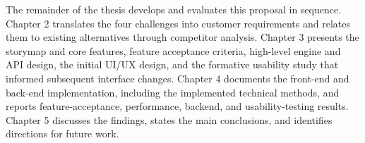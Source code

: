 The remainder of the thesis develops and evaluates this proposal in sequence.
Chapter 2 translates the four challenges into customer requirements and relates them to existing alternatives through competitor analysis.
Chapter 3 presents the storymap and core features, feature acceptance criteria, high-level engine and API design, the initial UI/UX design, and the formative usability study that informed subsequent interface changes.
Chapter 4 documents the front-end and back-end implementation, including the implemented technical methods, and reports feature-acceptance, performance, backend, and usability-testing results.
Chapter 5 discusses the findings, states the main conclusions, and identifies directions for future work.

